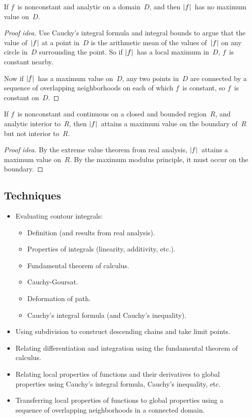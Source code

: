 \begin{thm}
If \(f\)~is nonconstant and analytic on a domain~\(D\), and then \(|{f}|\)~has no maximum value on~\(D\).
\end{thm}
\begin{proof}[Proof idea]
Use Cauchy's integral formula and integral bounds to argue that the value of~\(|{f}|\) at a point in~\(D\) is the arithmetic mean of the values of~\(|{f}|\) on any circle in~\(D\) surrounding the point. So if \(|{f}|\)~has a local maximum in~\(D\), \(f\)~is constant nearby.

Now if \(|{f}|\)~has a maximum value on~\(D\), any two points in~\(D\) are connected by a sequence of overlapping neighborhoods on each of which \(f\)~is constant, so \(f\)~is constant on~\(D\).
\end{proof}

\begin{cor}
If \(f\)~is nonconstant and continuous on a closed and bounded region~\(R\), and analytic interior to~\(R\), then \(|{f}|\)~attains a maximum value on the boundary of~\(R\) but not interior to~\(R\).
\end{cor}
\begin{proof}[Proof idea]
By the extreme value theorem from real analysis, \(|{f}|\)~attains a maximum value on~\(R\). By the maximum modulus principle, it must occur on the boundary.
\end{proof}

\subsection*{Techniques}
\begin{itemize}[itemsep=0pt]
\item Evaluating contour integrals:
\begin{itemize}[itemsep=0pt]
\item Definition (and results from real analysis).
\item Properties of integrals (linearity, additivity, etc.).
\item Fundamental theorem of calculus.
\item Cauchy-Goursat.
\item Deformation of path.
\item Cauchy's integral formula (and Cauchy's inequality).
\end{itemize}
\item Using subdivision to construct descending chains and take limit points.
\item Relating differentiation and integration using the fundamental theorem of calculus.
\item Relating local properties of functions and their derivatives to global properties using Cauchy's integral formula, Cauchy's inequality, etc.
\item Transferring local properties of functions to global properties using a sequence of overlapping neighborhoods in a connected domain.
\end{itemize}
